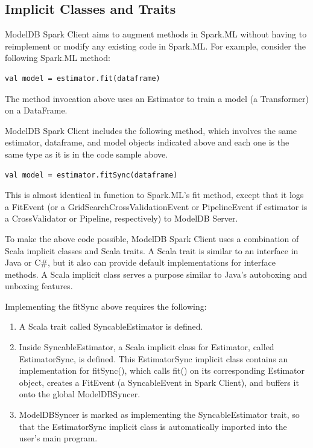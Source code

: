 \subsection{Implicit Classes and Traits}
ModelDB Spark Client aims to augment methods in Spark.ML without having to reimplement or
modify any existing code in Spark.ML. For example, consider the following Spark.ML method:

\begin{verbatim}
val model = estimator.fit(dataframe)
\end{verbatim}

The method invocation above uses an Estimator to train a model (a Transformer) on a DataFrame.


ModelDB Spark Client includes the following method, which involves the same estimator, dataframe,
and model objects indicated above and each one is the same type as it is in the code sample above.

\begin{verbatim}
val model = estimator.fitSync(dataframe)
\end{verbatim}

This is almost identical in function to Spark.ML's fit method, except that it logs a FitEvent
(or a GridSearchCrossValidationEvent or PipelineEvent if estimator is a CrossValidator or Pipeline,
respectively) to ModelDB Server.

To make the above code possible, ModelDB Spark Client uses a combination of Scala implicit classes
and Scala traits. A Scala trait is similar to an interface in Java or C\#, but it also can provide default
implementations for interface methods. A Scala implicit class serves a purpose similar to Java's autoboxing
and unboxing features.

Implementing the fitSync above requires the following:

\begin{enumerate}
\item A Scala trait called SyncableEstimator is defined.
\item Inside SyncableEstimator, a Scala implicit class for Estimator, called EstimatorSync,
is defined. This EstimatorSync implicit class contains an implementation for fitSync(), which calls fit()
on its corresponding Estimator object, creates a FitEvent (a SyncableEvent in Spark Client), and buffers it
onto the global ModelDBSyncer.
\item ModelDBSyncer is marked as implementing the SyncableEstimator trait, so that the EstimatorSync implicit class
is automatically imported into the user's main program. 
\end{enumerate}

